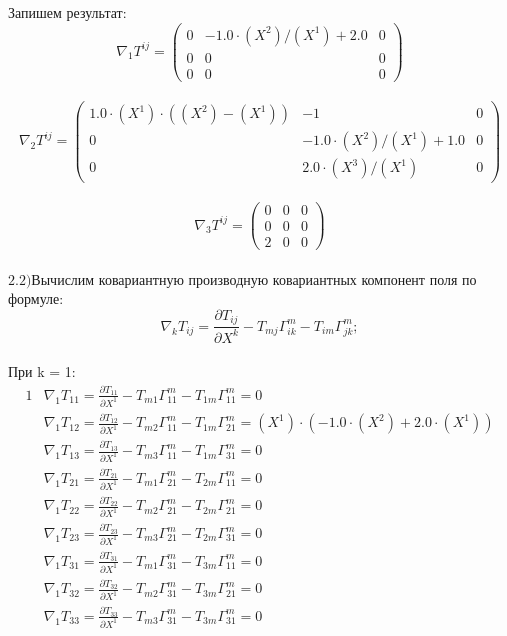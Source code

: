 \documentclass[a4paper, 12pt, oneside]{article}
\begin{document}
Запишем результат:\\
\[
\nabla_1T^{ij} = \begin{pmatrix}
	0 & -1.0\cdot (X^2)/(X^1) + 2.0 & 0\\
	0 & 0 & 0\\
	0 & 0 & 0
\end{pmatrix}
\]\\
\[
\nabla_2T^{ij} = \begin{pmatrix}
	1.0\cdot (X^1)\cdot ((X^2) - (X^1)) & -1 & 0\\
	0 & -1.0\cdot (X^2)/(X^1) + 1.0 & 0\\
	0 & 2.0\cdot (X^3)/(X^1) & 0
\end{pmatrix}
\]\\
\[
\nabla_3T^{ij} = \begin{pmatrix}
	0 & 0 & 0\\
	0 & 0 & 0\\
	2 & 0 & 0
\end{pmatrix}
\]\\
$\mathrm{2.2) }$Вычислим ковариантную производную ковариантных компонент поля по формуле:\\
\[
\nabla_kT_{ij} = \frac{\partial T_{ij}}{\partial X^k} - T_{mj}\Gamma^m_{ik} - T_{im}\Gamma^m_{jk};
\]\\
При k = 1:\\
\begin{alignat*}{1}
  & \nabla_1T_{11} = \frac{\partial T_{11}}{\partial X^1} - T_{m1}\Gamma^m_{11} - T_{1m}\Gamma^m_{11} = 0 \\
  & \nabla_1T_{12} = \frac{\partial T_{12}}{\partial X^1} - T_{m2}\Gamma^m_{11} - T_{1m}\Gamma^m_{21} = (X^1)\cdot (-1.0\cdot (X^2) + 2.0\cdot (X^1)) \\
  & \nabla_1T_{13} = \frac{\partial T_{13}}{\partial X^1} - T_{m3}\Gamma^m_{11} - T_{1m}\Gamma^m_{31} = 0 \\
  & \nabla_1T_{21} = \frac{\partial T_{21}}{\partial X^1} - T_{m1}\Gamma^m_{21} - T_{2m}\Gamma^m_{11} = 0 \\
  & \nabla_1T_{22} = \frac{\partial T_{22}}{\partial X^1} - T_{m2}\Gamma^m_{21} - T_{2m}\Gamma^m_{21} = 0 \\
  & \nabla_1T_{23} = \frac{\partial T_{23}}{\partial X^1} - T_{m3}\Gamma^m_{21} - T_{2m}\Gamma^m_{31} = 0 \\
  & \nabla_1T_{31} = \frac{\partial T_{31}}{\partial X^1} - T_{m1}\Gamma^m_{31} - T_{3m}\Gamma^m_{11} = 0 \\
  & \nabla_1T_{32} = \frac{\partial T_{32}}{\partial X^1} - T_{m2}\Gamma^m_{31} - T_{3m}\Gamma^m_{21} = 0 \\
  & \nabla_1T_{33} = \frac{\partial T_{33}}{\partial X^1} - T_{m3}\Gamma^m_{31} - T_{3m}\Gamma^m_{31} = 0 
\end{alignat*}\\
\end{document}
